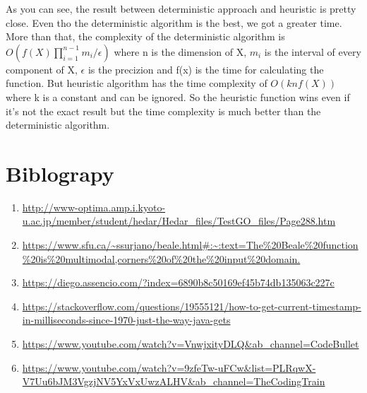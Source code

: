 \documentclass[12pt]{article}
\begin{document}
  As you can see, the result between deterministic approach and heuristic is pretty close. Even tho the deterministic algorithm
is the best, we got a greater time. More than that, the complexity of the deterministic algorithm is \( O( f(X) \prod_{i=1}^{n-1}m_i/\epsilon) \) where n is the dimension of X, \(m_i\) is the interval of every component of X, \(\epsilon\) is the precizion
and f(x) is the time for calculating the function. But heuristic algorithm has the time complexity of \( O(k n f(X)) \) where k is a constant and can be ignored. So the heuristic function wins even if it's not the exact result but the time complexity is much better than the deterministic algorithm.

\section*{Biblograpy}

\begin{enumerate}
  \item \url{http://www-optima.amp.i.kyoto-u.ac.jp/member/student/hedar/Hedar_files/TestGO_files/Page288.htm}
  \item \url{https://www.sfu.ca/~ssurjano/beale.html#:~:text=The%20Beale%20function%20is%20multimodal,corners%20of%20the%20input%20domain.}
  \item \url{https://diego.assencio.com/?index=6890b8c50169ef45b74db135063c227c}
  \item \url{https://stackoverflow.com/questions/19555121/how-to-get-current-timestamp-in-milliseconds-since-1970-just-the-way-java-gets}
  \item \url{https://www.youtube.com/watch?v=VnwjxityDLQ&ab_channel=CodeBullet}
  \item \url{https://www.youtube.com/watch?v=9zfeTw-uFCw&list=PLRqwX-V7Uu6bJM3VgzjNV5YxVxUwzALHV&ab_channel=TheCodingTrain}
\end{enumerate}
\end{document}
